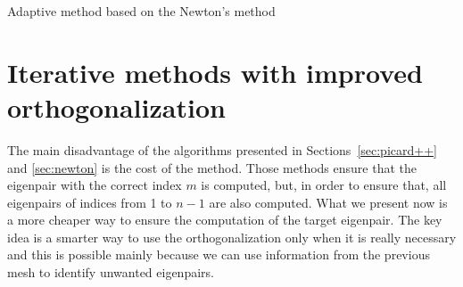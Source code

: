 \documentclass[preprint,12pt]{elsarticle}
\begin{document}
\begin{algorithm}[H] \caption{Adaptive method based on the Newton's method} \label{alg:newton_adapt} 
\begin{algorithmic}



\REPEAT
{}



\ENDFOR
{}
\end{algorithmic}
\end{algorithm}

\section{Iterative methods with improved orthogonalization}\label{sec:imp_ortho}

The main disadvantage of the algorithms presented in Sections~\ref{sec:picard++} and \ref{sec:newton} is the cost of the method. Those methods ensure that the eigenpair with the correct index $m$ is computed, but, in order to ensure that, all eigenpairs of indices from 1 to $n-1$ are also computed. What we present now is a more cheaper way to ensure the computation of the target eigenpair. The key idea is a smarter way to use the orthogonalization only when it is really necessary and this is possible mainly because we can use information from the previous mesh to identify unwanted eigenpairs.
\end{document}
